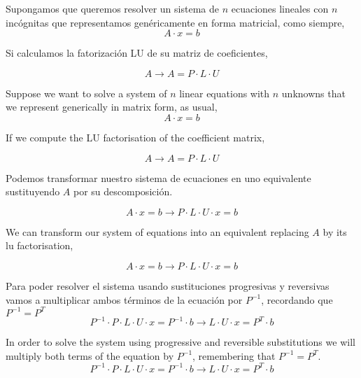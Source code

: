 \begin{paracol}{2}
\switchcolumn
Supongamos que queremos resolver un sistema de $n$ ecuaciones lineales con $n$ incógnitas que representamos genéricamente en forma matricial, como siempre,
\begin{equation*}
A\cdot x=b
\end{equation*}

Si calculamos la fatorización LU de su matriz de  coeficientes,

\begin{equation*}
A \rightarrow A =  P\cdot  L\cdot U
\end{equation*}

\switchcolumn
Suppose we want to solve a system of $n$ linear equations with $n$ unknowns that we represent generically in matrix form, as usual,
\begin{equation*}
A\cdot x=b
\end{equation*}

If we compute the LU factorisation of the coefficient matrix,

\begin{equation*}
A \rightarrow  A = P\cdot L\cdot U
\end{equation*}

\switchcolumn

Podemos transformar nuestro sistema de ecuaciones en uno equivalente sustituyendo $A$ por su descomposición.

\begin{equation*}
A\cdot x=b\rightarrow P\cdot L \cdot U \cdot x= b
\end{equation*}

\switchcolumn
We can transform our system of equations into an equivalent replacing $A$ by its lu factorisation,

\begin{equation*}
A\cdot x=b\rightarrow P\cdot L \cdot U \cdot x= b
\end{equation*}

\switchcolumn
Para poder resolver el sistema usando sustituciones progresivas y reversivas vamos a multiplicar ambos términos de la ecuación por $P^{-1}$, recordando que $P^{-1}=P^T$
\begin{equation*}
P^{-1} \cdot P\cdot L \cdot U \cdot x=P^{-1}\cdot b \rightarrow L\cdot U \cdot x= P^T\cdot b
\end{equation*}

\switchcolumn
In order to solve the system using progressive and reversible substitutions we will multiply both terms of the equation by $P^{-1}$, remembering that $P^{-1}=P^T$.
\begin{equation*}
P^{-1} \cdot P\cdot L \cdot U \cdot x=P^{-1}\cdot b \rightarrow L\cdot U \cdot x= P^T\cdot b
\end{equation*}


\end{paracol}

